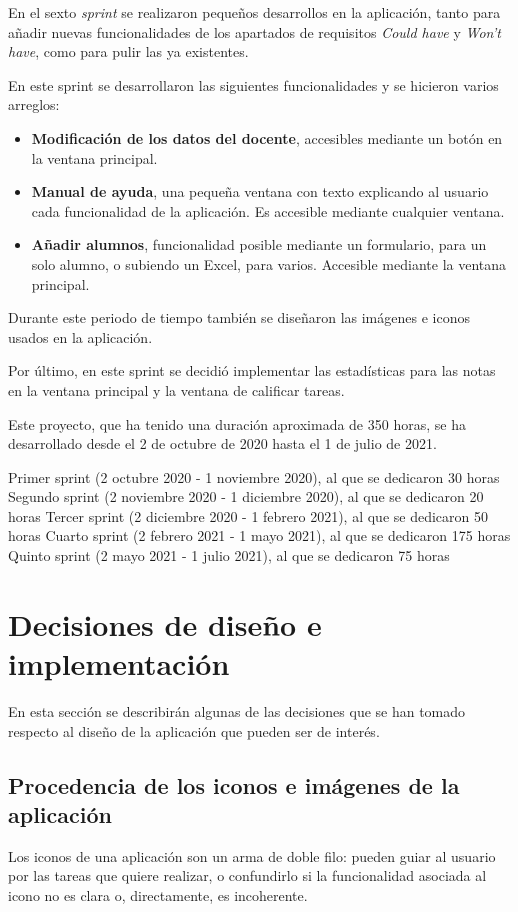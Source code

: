 En el sexto \textit{sprint} se realizaron pequeños desarrollos en la aplicación, tanto para añadir nuevas funcionalidades de los apartados de requisitos \textit{Could have} y \textit{Won't have}, como para pulir las ya existentes.

En este sprint se desarrollaron las siguientes funcionalidades y se hicieron varios arreglos:
\begin{itemize}
	\item \textbf{Modificación de los datos del docente}, accesibles mediante un botón en la ventana principal.
	\item \textbf{Manual de ayuda}, una pequeña ventana con texto explicando al usuario cada funcionalidad de la aplicación. Es accesible mediante cualquier ventana.
	\item \textbf{Añadir alumnos}, funcionalidad posible mediante un formulario, para un solo alumno, o subiendo un Excel, para varios. Accesible mediante la ventana principal.	
\end{itemize}

Durante este periodo de tiempo también se diseñaron las imágenes e iconos usados en la aplicación.

Por último, en este sprint se decidió implementar las estadísticas para las notas en la ventana principal y la ventana de calificar tareas.

Este proyecto, que ha tenido una duración aproximada de 350 horas, se ha desarrollado desde el 2 de octubre de 2020 hasta el 1 de julio de 2021.


Primer sprint (2 octubre 2020 - 1 noviembre 2020), al que se dedicaron 30 horas
Segundo sprint (2 noviembre 2020 - 1 diciembre 2020), al que se dedicaron 20 horas
Tercer sprint (2 diciembre 2020 - 1 febrero 2021), al que se dedicaron 50 horas
Cuarto sprint (2 febrero 2021 - 1 mayo 2021), al que se dedicaron 175 horas
Quinto sprint (2 mayo 2021 - 1 julio 2021), al que se dedicaron 75 horas

\section{Decisiones de diseño e implementación}
En esta sección se describirán algunas de las decisiones que se han tomado respecto al diseño de la aplicación que pueden ser de interés.

\subsection{Procedencia de los iconos e imágenes de la aplicación}
Los iconos de una aplicación son un arma de doble filo: pueden guiar al usuario por las tareas que quiere realizar, o confundirlo si la funcionalidad asociada al icono no es clara o, directamente, es incoherente.

